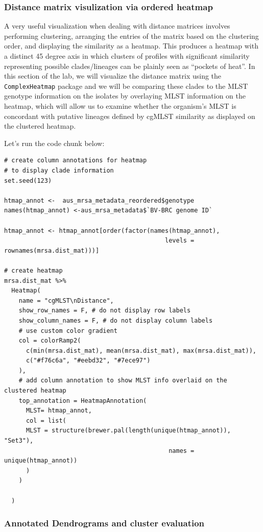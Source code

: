 \documentclass[
]{book}
\begin{document}
\subsubsection{Distance matrix visulization via ordered heatmap}\label{distance-matrix-visulization-via-ordered-heatmap}

A very useful visualization when dealing with distance matrices involves performing clustering, arranging the entries of the matrix based on the clustering order, and displaying the similarity as a heatmap. This produces a heatmap with a distinct 45 degree axis in which clusters of profiles with significant similarity representing possible clades/lineages can be plainly seen as ``pockets of heat''. In this section of the lab, we will visualize the distance matrix using the \texttt{ComplexHeatmap} package and we will be comparing these clades to the MLST genotype information on the isolates by overlaying MLST information on the heatmap, which will allow us to examine whether the organism's MLST is concordant with putative lineages defined by cgMLST similarity as displayed on the clustered heatmap.

Let's run the code chunk below:

\begin{verbatim}
# create column annotations for heatmap
# to display clade information
set.seed(123)

htmap_annot <-  aus_mrsa_metadata_reordered$genotype
names(htmap_annot) <-aus_mrsa_metadata$`BV-BRC genome ID`

htmap_annot <- htmap_annot[order(factor(names(htmap_annot),
                                            levels = rownames(mrsa.dist_mat)))]

# create heatmap
mrsa.dist_mat %>% 
  Heatmap(
    name = "cgMLST\nDistance",
    show_row_names = F, # do not display row labels
    show_column_names = F, # do not display column labels
    # use custom color gradient
    col = colorRamp2(
      c(min(mrsa.dist_mat), mean(mrsa.dist_mat), max(mrsa.dist_mat)),
      c("#f76c6a", "#eebd32", "#7ece97")
    ),
    # add column annotation to show MLST info overlaid on the clustered heatmap
    top_annotation = HeatmapAnnotation(
      MLST= htmap_annot,
      col = list(
      MLST = structure(brewer.pal(length(unique(htmap_annot)), "Set3"),
                                             names = unique(htmap_annot))
      )
    )
    
  )
\end{verbatim}

\subsubsection{Annotated Dendrograms and cluster evaluation}\label{annotated-dendrograms-and-cluster-evaluation}
\end{document}
